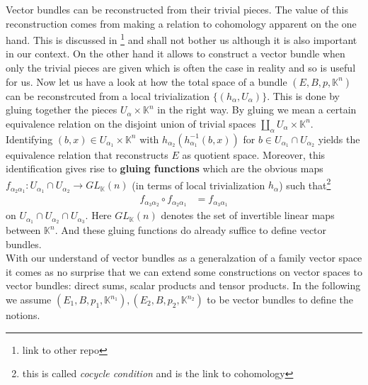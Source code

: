 Vector bundles can be reconstructed from their trivial pieces. The value of this reconstruction comes from making a relation to cohomology apparent on the one hand. This is discussed in \footnote{link to other repo} and shall not bother us although it is also important in our context. On the other hand it allows to construct a vector bundle when only the trivial pieces are given which is often the case in reality and so is useful for us. Now let us have a look at how the total space of a bundle $(E,B,p,\mathbb{K}^{n})$ can be reconstrcuted from a local trivialization $\lbrace (h_{\alpha},U_{\alpha}) \rbrace$. This is done by {\glqq}gluing together{\grqq} the pieces $U_{\alpha} \times \mathbb{K}^{n}$ in the right way. By gluing we mean a certain equivalence relation on the disjoint union of trivial spaces $\coprod_{\alpha}U_{\alpha} \times \mathbb{K}^{n}$. Identifying $(b,x) \in U_{\alpha_{1}} \times \mathbb{K}^{n}$ with $h_{\alpha_{2}}(h_{\alpha_{1}}^{-1}(b,x))$ for $b \in U_{\alpha_{1}} \cap U_{\alpha_{2}}$ yields the equivalence relation that reconstructs $E$ as quotient space. Moreover, this identification gives rise to \textbf{gluing functions} which are the obvious maps $f_{\alpha_{2}\alpha_{1}} \colon U_{\alpha_{1}} \cap U_{\alpha_{2}} \to GL_{\mathbb{K}}(n)$ (in terms of local trivialization $h_{\alpha}$) such that\footnote{this is called \textit{cocycle condition} and is the link to cohomology}
\begin{align*}
  f_{\alpha_{3}\alpha_{2}}
  \circ
  f_{\alpha_{2}\alpha_{1}}
  &=
  f_{\alpha_{3}\alpha_{1}}
\end{align*}
on $U_{\alpha_{1}} \cap U_{\alpha_{2}} \cap U_{\alpha_{3}}$. Here $GL_{\mathbb{K}}(n)$ denotes the set of invertible linear maps between $\mathbb{K}^{n}$. And these gluing functions do already suffice to define vector bundles.
\\
With our understand of vector bundles as a generalzation of a family vector space it comes as no surprise that we can extend some constructions on vector spaces to vector bundles: direct sums, scalar products and tensor products. In the following we assume $(E_{1},B,p_{1},\mathbb{K}^{n_{1}}),(E_{2},B,p_{2},\mathbb{K}^{n_{2}})$ to be vector bundles to define the notions. 
